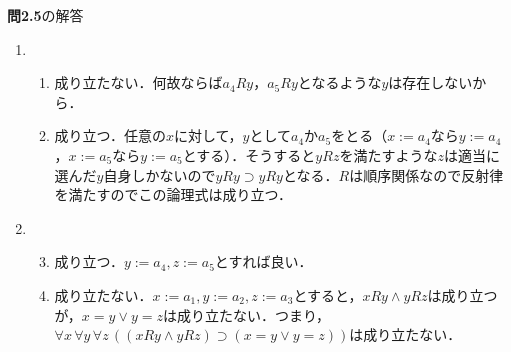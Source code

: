 \documentclass[11pt,dvipdfmx]{jreport}
\begin{document}
\noindent \textbf{問2.5}の解答 
\renewcommand{\labelenumi}{(\arabic{enumi}) }
\renewcommand{\labelenumii}{\arabic{enumii}) }
\begin{enumerate}
 \item 
  \begin{enumerate}
   \item 成り立たない．何故ならば$a_{4}Ry$，$a_{5}Ry$となるような$y$は存在しないから．
   \item 成り立つ．任意の$x$に対して，$y$として$a_{4}$か$a_{5}$をとる（$x := a_{4}$なら$y := a_{4}$，$x := a_{5}$なら$y := a_{5}$とする）．そうすると$yRz$を満たすような$z$は適当に選んだ$y$自身しかないので$yRy \supset yRy$となる．$R$は順序関係なので反射律を満たすのでこの論理式は成り立つ．
  \end{enumerate}
 \item 
　\begin{enumerate}
   \setcounter{enumii}{2}
   \item 成り立つ．$y := a_{4}, z := a_{5}$とすれば良い．
   \item 成り立たない．$x := a_{1}, y := a_{2}, z := a_{3}$とすると，$xRy \land yRz$は成り立つが，$x = y \lor y = z$は成り立たない．つまり，$\forall x \, \forall y \, \forall z \, ((xRy \land yRz) \supset (x=y \lor y = z))$は成り立たない．
 \end{enumerate}
\end{enumerate}

\par
\vspace{5mm}
\end{document}
